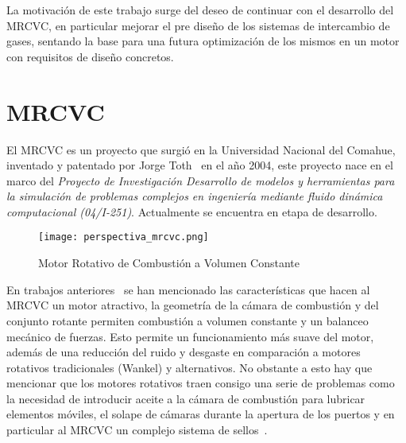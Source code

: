 La motivación de este trabajo surge del deseo de continuar con el desarrollo
del MRCVC, en particular mejorar el pre diseño de los sistemas de intercambio
de gases, sentando la base para una futura optimización de los mismos en un
motor con requisitos de diseño concretos.

\section{MRCVC}
%
El MRCVC es un proyecto que surgió en la Universidad Nacional del Comahue,
inventado y patentado por Jorge Toth~\cite{toth} en el año 2004, este proyecto
nace en el marco del \emph{Proyecto de Investigación Desarrollo de modelos y
herramientas para la simulación de problemas complejos en ingeniería mediante
fluido dinámica computacional (04/I-251)}. Actualmente se encuentra en etapa de
desarrollo.

\begin{figure}
    \centering
    \texttt{[image: perspectiva\_mrcvc.png]}
    \caption{Motor Rotativo de Combustión a Volumen Constante}\label{fig:mrcvc}
\end{figure}

En trabajos anteriores~\cite{lopez16, lopez13, roldan} se han mencionado las
características que hacen al MRCVC un motor atractivo, la geometría de la
cámara de combustión y del conjunto rotante permiten  combustión a volumen
constante y un balanceo mecánico de fuerzas.
%
Esto permite un funcionamiento más suave del motor, además de una reducción del
ruido y desgaste en comparación a motores rotativos tradicionales (Wankel) y
alternativos.
%
No obstante a esto hay que mencionar que los motores rotativos traen consigo
una serie de problemas como la necesidad de introducir aceite a la cámara de
combustión para lubricar elementos móviles, el solape de cámaras durante la
apertura de los puertos y en particular al MRCVC un complejo sistema de
sellos~\cite{roldan}.


